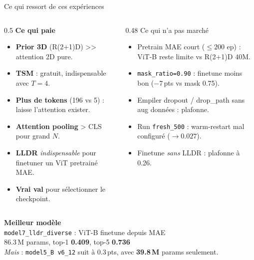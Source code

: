 \documentclass[10pt,aspectratio=169]{beamer}
\newcommand{\hl}[1]{\textcolor{accent}{\textbf{#1}}}
\newcommand{\good}[1]{\textcolor{good}{\textbf{#1}}}
\begin{document}
\begin{frame}{Ce qui ressort de ces expériences}
  \begin{columns}[T,onlytextwidth]
    \begin{column}{0.5\textwidth}
      \good{Ce qui paie}
      \begin{itemize}
        \item \hl{Prior 3D} (R(2+1)D) >> attention 2D pure.
        \item \hl{TSM} : gratuit, indispensable avec $T{=}4$.
        \item \hl{Plus de tokens} (196 vs 5) : laisse l'attention exister.
        \item \hl{Attention pooling} > CLS pour grand $N$.
        \item \hl{LLDR} \emph{indispensable} pour finetuner un ViT pretrainé MAE.
        \item \hl{Vrai val} pour sélectionner le checkpoint.
      \end{itemize}
    \end{column}
    \begin{column}{0.48\textwidth}
      \alert{Ce qui n'a pas marché}
      \begin{itemize}
        \item Pretrain MAE court ($\leq 200$ ep) : ViT-B reste limite vs R(2+1)D 40M.
        \item \texttt{mask\_ratio=0.90} : finetune moins bon ($-7$\,pts vs mask 0.75).
        \item Empiler dropout / drop\_path sans aug données : plafonne.
        \item Run \texttt{fresh\_500} : warm-restart mal configuré ($\to 0.027$).
        \item Finetune \emph{sans} LLDR : plafonne à 0.26.
      \end{itemize}
    \end{column}
  \end{columns}
\end{frame}

\begin{frame}
  \begin{center}
    \Large \textbf{Meilleur modèle} \\[0.5em]
    \texttt{model7\_lldr\_diverse} : ViT-B finetune depuis MAE\\
    86.3\,M params, top-1 \good{0.409}, top-5 \good{0.736} \\[0.6em]
    \emph{Mais} : \texttt{model5\_B v6\_12} suit à 0.3\,pts, avec \good{39.8\,M} params seulement.
  \end{center}
\end{frame}
\end{document}
